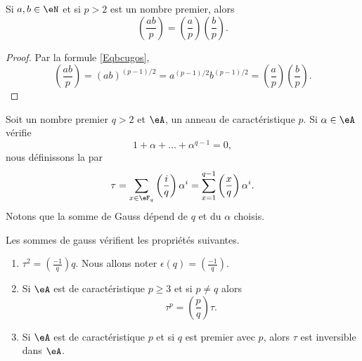 \begin{corollary}   \label{CoruJosNz}
    Si \( a,b\in \eN\) et si \( p>2\) est un nombre premier, alors
    \begin{equation}
        \left(\frac{ab}{p}\right)=\left(\frac{a}{p}\right)\left(\frac{b}{p}\right).
    \end{equation}
\end{corollary}

\begin{proof}
    Par la formule \eqref{Eqbcugos},
    \begin{equation}
        \left(\frac{ab}{p}\right)=(ab)^{(p-1)/2}=a^{(p-1)/2}b^{(p-1)/2}=\left(\frac{a}{p}\right)\left(\frac{b}{p}\right).
    \end{equation}
\end{proof}

Soit un nombre premier \( q>2\) et \( \eA\), un anneau de caractéristique \( p\). Si \( \alpha\in \eA\) vérifie
\begin{equation}
    1+\alpha+\ldots+\alpha^{q-1}=0,
\end{equation}
nous définissons la  par
\begin{equation}
    \tau=\sum_{x\in \eF_q}\left(\frac{i}{q}\right)\alpha^i=\sum_{x=1}^{q-1}\left(\frac{x}{q}\right)\alpha^i.
\end{equation}
Notons que la somme de Gauss dépend de \( q\) et du \( \alpha\) choisis.

\begin{proposition} \label{PropciRUov}
    Les sommes de gauss vérifient les propriétés suivantes.
    \begin{enumerate}
        \item
            $\tau^2=\left(\frac{-1}{q}\right)q$. Nous allons noter \( \epsilon(q)=\left(\frac{-1}{q}\right)\).

        \item
            Si \( \eA\) est de caractéristique \( p\geq 3\) et si \( p\neq q\) alors
            \begin{equation}    \label{EqxBNpJz}
                \tau^p=\left(\frac{p}{q}\right)\tau.
            \end{equation}
        \item
            Si \( \eA\) est de caractéristique \( p\) et si \( q\) est premier avec \( p\), alors \( \tau\) est inversible dans \( \eA\).
    \end{enumerate}
\end{proposition}

